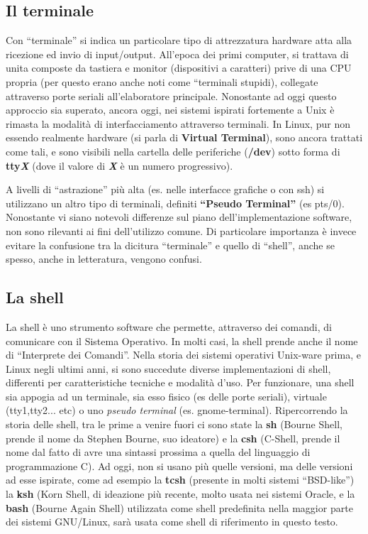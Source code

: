 \subsection{Il terminale}

Con ``terminale'' si indica un particolare tipo di attrezzatura hardware atta alla ricezione ed invio di input/output. All'epoca dei primi computer, si trattava di unita composte da tastiera e monitor (dispositivi a caratteri) prive di una CPU propria (per questo erano anche noti come ``terminali stupidi), collegate attraverso porte seriali all'elaboratore principale.
Nonostante ad oggi questo approccio sia superato, ancora oggi, nei sistemi ispirati fortemente a Unix è rimasta la modalità di interfacciamento attraverso terminali. In Linux, pur non essendo realmente hardware (si parla di \textbf{Virtual Terminal}), sono ancora trattati come tali, e sono visibili nella cartella delle periferiche (\textbf{/dev}) sotto forma di \textbf{tty\textit{X}} (dove il valore di \textbf{\textit{X}} è un numero progressivo).

A livelli di ``astrazione'' più alta (es. nelle interfacce grafiche o con ssh) si utilizzano un altro tipo di terminali, definiti \textbf{``Pseudo Terminal''} (es pts/0). Nonostante vi siano notevoli differenze sul piano dell'implementazione software, non sono rilevanti ai fini dell'utilizzo comune. 
Di particolare importanza è invece evitare la confusione tra la dicitura ``terminale'' e quello di ``shell'', anche se spesso, anche in letteratura, vengono confusi. 

\subsection{La shell}

La shell è uno strumento software che permette, attraverso dei comandi, di comunicare con il Sistema Operativo. In molti casi, la shell prende anche il nome di ``Interprete dei Comandi''. 
Nella storia dei sistemi operativi Unix-ware prima, e Linux negli ultimi anni, si sono succedute diverse implementazioni di shell, differenti per caratteristiche tecniche e modalità d'uso. 
Per funzionare, una shell sia appogia ad un terminale, sia esso fisico (es delle porte seriali), virtuale (tty1,tty2... etc) o uno \textit{pseudo terminal} (es. gnome-terminal).
Ripercorrendo la storia delle shell, tra le prime a venire fuori ci sono state la \textbf{sh} (Bourne Shell, prende il nome da Stephen Bourne, suo ideatore) e la \textbf{csh} (C-Shell, prende il nome dal fatto di avre una sintassi prossima a quella del linguaggio di programmazione C). 
Ad oggi, non si usano più quelle versioni, ma delle versioni ad esse ispirate, come ad esempio la \textbf{tcsh} (presente in molti sistemi ``BSD-like'') la \textbf{ksh} (Korn Shell, di ideazione più recente, molto usata nei sistemi Oracle\textregistered, e la \textbf{bash} (Bourne Again Shell) utilizzata come shell predefinita nella maggior parte dei sistemi GNU/Linux, sarà usata come shell di riferimento in questo testo. 

